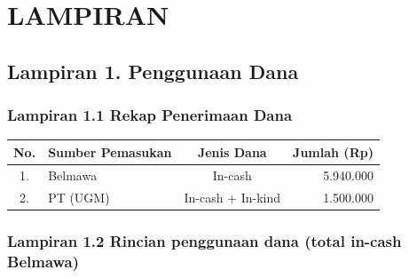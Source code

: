 \documentclass[12pt,a4paper]{article}
\begin{document}
\newpage
\section*{LAMPIRAN}

\subsection*{Lampiran 1. Penggunaan Dana}

\subsubsection*{Lampiran 1.1 Rekap Penerimaan Dana}

\begin{table}[htbp]
\centering
\begin{tabular}{|c|l|c|r|}
\hline
\textbf{No.} & \textbf{Sumber Pemasukan} & \textbf{Jenis Dana} & \textbf{Jumlah (Rp)} \\ \hline
1. & Belmawa & In-cash & 5.940.000 \\ \hline
2. & PT (UGM) & In-cash + In-kind & 1.500.000 \\ \hline
\end{tabular}
\end{table}

\subsubsection*{Lampiran 1.2 Rincian penggunaan dana (total in-cash Belmawa)}
\end{document}
